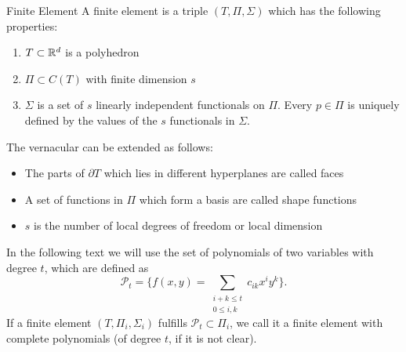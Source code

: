 \begin{defn}{Finite Element}
    A finite element is a triple $(T, \Pi,\Sigma)$ which has the following properties:
    \label{def:finite_element}
    \begin{enumerate}
        \item $T\subset \mathbb{R}^d$ is a polyhedron
        \item $\Pi \subset C(T)$ with finite dimension $s$
        \item $\Sigma$ is a set of $s$ linearly independent functionals on $\Pi$. 
        Every $p\in \Pi$ is uniquely defined by the values of the $s$ functionals in $\Sigma$.
    \end{enumerate}
\end{defn}
The vernacular can be extended as follows:
\begin{itemize}
    \item The parts of $\partial T$ which lies in different hyperplanes are called faces
    \item A set of functions in $\Pi$ which form a basis are called shape functions 
    \item $s$ is the number of local degrees of freedom or local dimension
\end{itemize}
In the following text we will use the set of polynomials of two variables 
with degree $t$, which are defined as 
\begin{equation*}
\mathcal{P}_t = \{ f(x,y) = \sum_{\substack{i+k \leq t\\ 0\leq i,k}} c_{ik}x^i y^k \}.
\end{equation*}
If a finite element $(T, \Pi_i,\Sigma_i)$ fulfills 
    $\mathcal{P}_t \subset \Pi_i$,
we call it a finite element with complete polynomials (of degree $t$, if 
it is not clear).